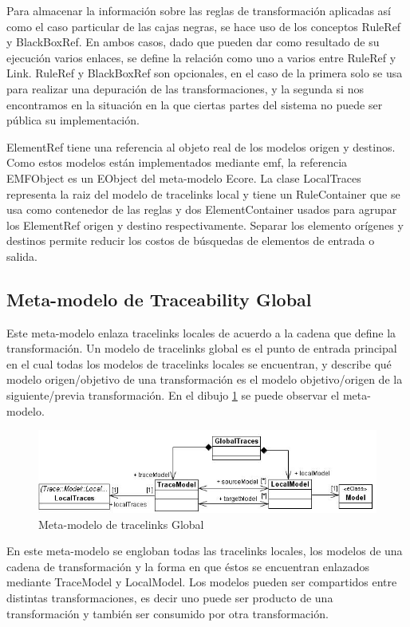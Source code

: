 \documentclass[a4paper,12pt,oneside,spanish]{book}
\begin{document}
Para almacenar la información sobre las reglas de transformación aplicadas así como el caso particular de las cajas negras, se hace uso de los conceptos RuleRef y BlackBoxRef. En ambos casos, dado que pueden dar como resultado de su ejecución varios enlaces, se define la relación como uno a varios entre RuleRef y Link. RuleRef y BlackBoxRef son opcionales, en el caso de la primera solo se usa para realizar una depuración de las transformaciones, y la segunda si nos encontramos en la situación en la que ciertas partes del sistema no puede ser pública su implementación.

ElementRef tiene una referencia al objeto real de los modelos origen y destinos. Como estos modelos están implementados mediante \gls{emf}, la referencia EMFObject es un EObject del meta-modelo \textsf{Ecore}. La clase LocalTraces representa la raiz del modelo de tracelinks local y tiene un RuleContainer que se usa como contenedor de las reglas y dos ElementContainer usados para agrupar los ElementRef origen y destino respectivamente. Separar los elemento orígenes y destinos permite reducir los costos de búsquedas de elementos de entrada o salida.

\subsection{Meta-modelo de Traceability Global}

Este meta-modelo enlaza tracelinks locales de acuerdo a la cadena que define la transformación. Un modelo de tracelinks global es el punto de entrada principal en el cual todas los modelos de tracelinks locales se encuentran, y describe qué modelo origen/objetivo de una transformación es el modelo objetivo/origen de la siguiente/previa transformación. En el dibujo \ref{fig:GlobalTraceMetamodel} se puede observar el meta-modelo.

\begin{figure}[hbtp]
\centering
\includegraphics[scale=.62]{./img/GlobalTraceMetamodel}
\caption{Meta-modelo de tracelinks Global}
\label{fig:GlobalTraceMetamodel}
\end{figure}

En este meta-modelo se engloban todas las tracelinks locales, los modelos de una cadena de transformación y la forma en que éstos se encuentran enlazados mediante TraceModel y LocalModel. Los modelos pueden ser compartidos entre distintas transformaciones, es decir uno puede ser producto de una transformación y también ser consumido por otra transformación.
\end{document}

